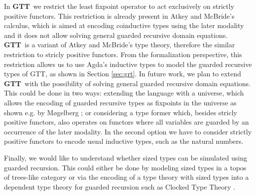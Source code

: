 \documentclass[a4paper,UKenglish,cleveref, autoref,numberwithinsect]{lipics-v2019}
\newcommand{\IC}{\AgdaInductiveConstructor}
\newcommand{\Ar}{\AgdaArgument}
\newcommand{\remove}[1]{}
\newcommand{\GTT}{\textbf{GTT}}
\begin{document}
\remove{
Finally, we want to understand whether it is possible to reduce sized
types to guarded recursion.  This does not seems directly doable,
since sizes are not uniquely employed with coinductive types as a tool
for easing the productivity check of corecursive definitions, but they
are also used as auxiliary arguments of inductive types for
facilitating the termination check of recursive definitions. It seems
that, in order to capture this dual aspect of sizes, one needs to
extend the existing type theories for guarded recursion with
additional features.
}

In \GTT\, we restrict the least fixpoint 
operator \IC{μ} to act exclusively on strictly positive functors. This restriction is already 
present in Atkey and McBride's calculus, which is aimed at 
encoding coinductive types using the later modality and it does 
not allow solving general guarded recursive domain equations.
\GTT\ is a variant of Atkey and McBride's type theory, therefore the
similar restriction to stricly positive functors.  From the
formalization perspective, this restriction allows us to use Agda's
inductive types to model the guarded recursive types of GTT, as shown
in Section \ref{sec:grt}. In future work, we plan to extend \GTT\ with
the possibility of solving general guarded recursive domain
equations. This could be done in two ways: extending the language with
a universe, which allows the encoding of guarded recursive types as
fixpoints in the universe as shown e.g. by M{\o}gelberg
\cite{Mogelberg14}; or considering a \IC{μ} type former which, besides
stricly positive functors, also operates on functors where all
variables are guarded by an occurrence of the later modality. In the
second option we have to consider strictly positive functors to encode
usual inductive types, such as the natural numbers.

Finally, we would like to understand whether sized types can be
simulated using guarded recursion.
This could either be done by modeling sized types in a topos of
trees-like category \cite{BMSS-synthetic,MannaaM18} or via the
encoding of a type theory with sized types into a dependent type
theory for guarded recursion such as Clocked Type Theory
\cite{BahrGM17}. 







\end{document}
